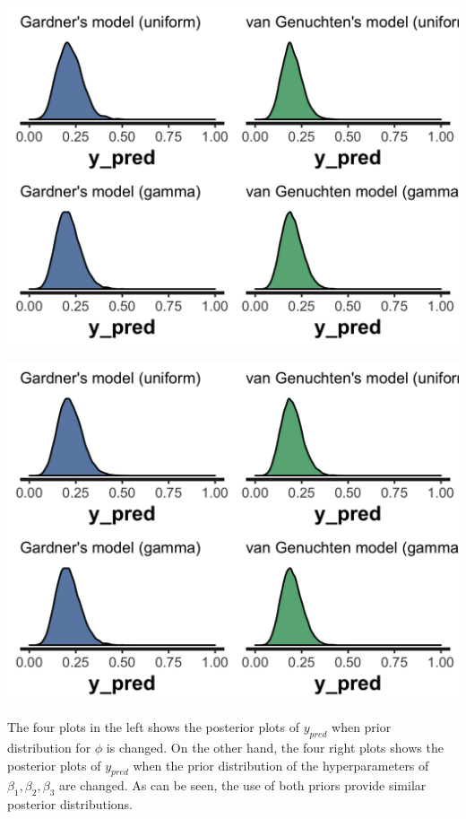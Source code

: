 \documentclass{article}
\begin{document}
\begin{minipage}{0.50\textwidth}
\includegraphics[width=\linewidth]{sens_pred.png}
\end{minipage}
\begin{minipage}{0.50\textwidth}
\includegraphics[width=\linewidth]{sens_pred2.png}
\end{minipage}

The four plots in the left shows the posterior plots of $y_{pred}$ when prior distribution for $\phi$ is changed. On the other hand, the four right plots shows the posterior plots of $y_{pred}$ when the prior distribution of the hyperparameters of $\beta_1, \beta_2, \beta_3$ are changed. As can be seen, the use of both priors provide similar posterior distributions.
\end{document}
